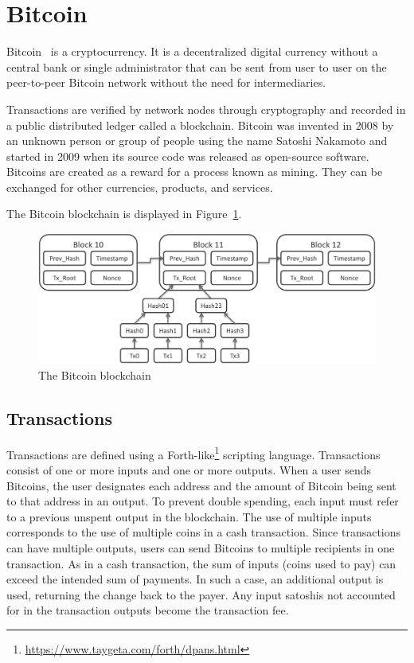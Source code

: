 \section{Bitcoin}

Bitcoin~\cite{nakamoto} is a cryptocurrency. It is a decentralized digital
currency without a central bank or single administrator that can be sent from
user to user on the peer-to-peer Bitcoin network without the need for
intermediaries.

Transactions are verified by network nodes through cryptography and recorded in
a public distributed ledger called a blockchain. Bitcoin was invented in 2008
by an unknown person or group of people using the name Satoshi Nakamoto and
started in 2009 when its source code was released as open-source software.
Bitcoins are created as a reward for a process known as mining. They can be
exchanged for other currencies, products, and services.

The Bitcoin blockchain is displayed in Figure~\ref{fig:Bitcoin-blockchain}.

\begin{figure}[H]
  \begin{center}
    \includegraphics[width=0.6\columnwidth]{images/Bitcoin-blockchain.png}
  \end{center}
  \caption{The Bitcoin blockchain}
  \label{fig:Bitcoin-blockchain}
\end{figure}

\subsection{Transactions}

Transactions are defined using a
Forth-like\footnote{\url{https://www.taygeta.com/forth/dpans.html}} scripting
language. Transactions consist of one or more inputs and one or more outputs.
When a user sends Bitcoins, the user designates each address and the amount of
Bitcoin being sent to that address in an output. To prevent double spending,
each input must refer to a previous unspent output in the blockchain. The use
of multiple inputs corresponds to the use of multiple coins in a cash
transaction. Since transactions can have multiple outputs, users can send
Bitcoins to multiple recipients in one transaction. As in a cash transaction,
the sum of inputs (coins used to pay) can exceed the intended sum of payments.
In such a case, an additional output is used, returning the change back to the
payer. Any input satoshis not accounted for in the transaction outputs become
the transaction fee.

